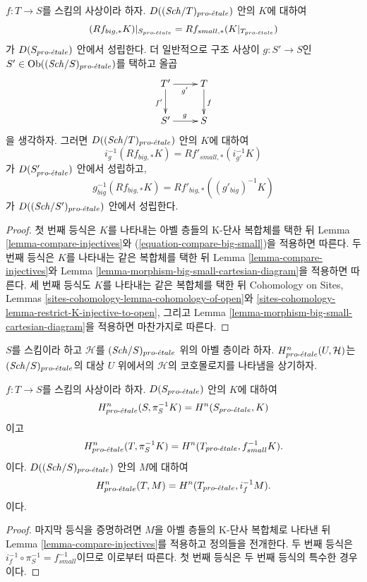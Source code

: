 \begin{lemma}
\label{lemma-compare-higher-direct-image}
$f : T \to S$를 스킴의 사상이라 하자.
$D((\mathit{Sch}/T)_{pro\text{-}\acute{e}tale})$ 안의 $K$에 대하여
$$
(Rf_{big, *}K)|_{S_{pro\text{-}\acute{e}tale}} = Rf_{small, *}(K|_{T_{pro\text{-}\acute{e}tale}})
$$
가 $D(S_{pro\text{-}\acute{e}tale})$ 안에서 성립한다. 더 일반적으로 구조 사상이
$g : S' \to S$인 $S' \in \mathop{\mathrm{Ob}}\nolimits((\mathit{Sch}/S)_{pro\text{-}\acute{e}tale})$를 택하고 올곱
$$
\xymatrix{
T' \ar[r]_{g'} \ar[d]_{f'} & T \ar[d]^f \\
S' \ar[r]^g & S
}
$$
을 생각하자. 그러면 $D((\mathit{Sch}/T)_{pro\text{-}\acute{e}tale})$ 안의 $K$에 대하여
$$
i_g^{-1}(Rf_{big, *}K) = Rf'_{small, *}(i_{g'}^{-1}K)
$$
가 $D(S'_{pro\text{-}\acute{e}tale})$ 안에서 성립하고,
$$
g_{big}^{-1}(Rf_{big, *}K) = Rf'_{big, *}((g'_{big})^{-1}K)
$$
가 $D((\mathit{Sch}/S')_{pro\text{-}\acute{e}tale})$ 안에서 성립한다.
\end{lemma}

\begin{proof}
첫 번째 등식은 $K$를 나타내는 아벨 층들의 K-단사 복합체를 택한 뒤
Lemma \ref{lemma-compare-injectives}와
(\ref{equation-compare-big-small})을 적용하면 따른다.
두 번째 등식은 $K$를 나타내는 같은 복합체를 택한 뒤 Lemma
\ref{lemma-compare-injectives}와 Lemma
\ref{lemma-morphism-big-small-cartesian-diagram}을 적용하면 따른다.
세 번째 등식도 $K$를 나타내는 같은 복합체를 택한 뒤 Cohomology on Sites, Lemmas
\ref{sites-cohomology-lemma-cohomology-of-open}와
\ref{sites-cohomology-lemma-restrict-K-injective-to-open}, 그리고 Lemma
\ref{lemma-morphism-big-small-cartesian-diagram}을 적용하면 마찬가지로
따른다.
\end{proof}

\noindent
$S$를 스킴이라 하고 $\mathcal{H}$를 $(\mathit{Sch}/S)_{pro\text{-}\acute{e}tale}$ 위의 아벨
층이라 하자. $H^n_{pro\text{-}\acute{e}tale}(U, \mathcal{H})$는
$(\mathit{Sch}/S)_{pro\text{-}\acute{e}tale}$의 대상 $U$ 위에서의 $\mathcal{H}$의 코호몰로지를
나타냄을 상기하자.

\begin{lemma}
\label{lemma-compare-cohomology-big-small}
$f : T \to S$를 스킴의 사상이라 하자. $D(S_{pro\text{-}\acute{e}tale})$ 안의 $K$에
대하여
$$
H^n_{pro\text{-}\acute{e}tale}(S, \pi_S^{-1}K) = H^n(S_{pro\text{-}\acute{e}tale}, K)
$$
이고
$$
H^n_{pro\text{-}\acute{e}tale}(T, \pi_S^{-1}K) = H^n(T_{pro\text{-}\acute{e}tale}, f_{small}^{-1}K).
$$
이다. $D((\mathit{Sch}/S)_{pro\text{-}\acute{e}tale})$ 안의 $M$에 대하여
$$
H^n_{pro\text{-}\acute{e}tale}(T, M) = H^n(T_{pro\text{-}\acute{e}tale}, i_f^{-1}M).
$$
이다.
\end{lemma}

\begin{proof}
마지막 등식을 증명하려면 $M$을 아벨 층들의 K-단사 복합체로 나타낸
뒤 Lemma \ref{lemma-compare-injectives}를 적용하고 정의들을 전개한다.
두 번째 등식은 $i_f^{-1} \circ \pi_S^{-1} = f_{small}^{-1}$이므로
이로부터 따른다. 첫 번째 등식은 두 번째 등식의 특수한 경우이다.
\end{proof}

